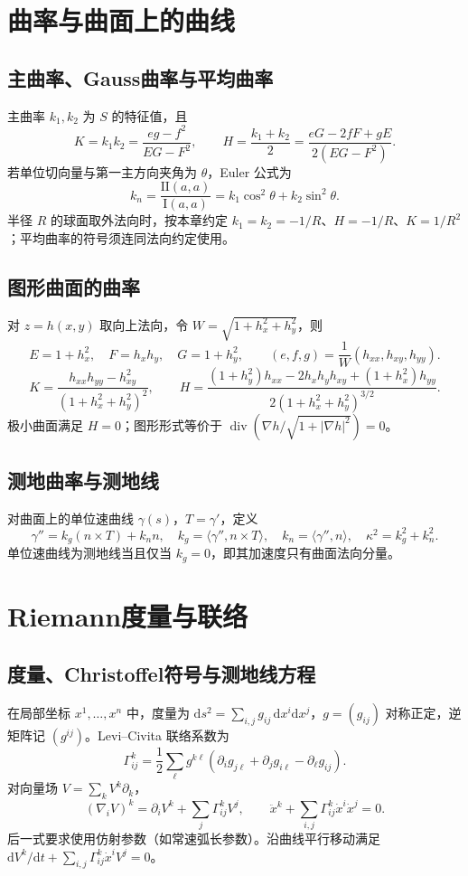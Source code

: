 \documentclass[../main.tex]{subfiles}
\begin{document}
\section{曲率与曲面上的曲线}
\subsection{主曲率、Gauss曲率与平均曲率}
主曲率 $k_1,k_2$ 为 $S$ 的特征值，且
\[
K=k_1k_2=\frac{eg-f^2}{EG-F^2},\qquad
H=\frac{k_1+k_2}2=\frac{eG-2fF+gE}{2(EG-F^2)}.
\]
若单位切向量与第一主方向夹角为 $\theta$，Euler 公式为
\[
k_n=\frac{\mathrm{II}(a,a)}{\mathrm I(a,a)}
=k_1\cos^2\theta+k_2\sin^2\theta.
\]
半径 $R$ 的球面取外法向时，按本章约定 $k_1=k_2=-1/R$、$H=-1/R$、$K=1/R^2$；平均曲率的符号须连同法向约定使用。
\subsection{图形曲面的曲率}
对 $z=h(x,y)$ 取向上法向，令 $W=\sqrt{1+h_x^2+h_y^2}$，则
\[
E=1+h_x^2,\quad F=h_xh_y,\quad G=1+h_y^2,\qquad
(e,f,g)=\frac1W(h_{xx},h_{xy},h_{yy}).
\]
\[
K=\frac{h_{xx}h_{yy}-h_{xy}^2}{(1+h_x^2+h_y^2)^2},\qquad
H=\frac{(1+h_y^2)h_{xx}-2h_xh_yh_{xy}+(1+h_x^2)h_{yy}}{2(1+h_x^2+h_y^2)^{3/2}}.
\]
极小曲面满足 $H=0$；图形形式等价于 $\operatorname{div}(\nabla h/\sqrt{1+|\nabla h|^2})=0$。
\subsection{测地曲率与测地线}
对曲面上的单位速曲线 $\gamma(s)$，$T=\gamma'$，定义
\[
\gamma''=k_g(n\times T)+k_nn,\quad
k_g=\langle\gamma'',n\times T\rangle,\quad k_n=\langle\gamma'',n\rangle,
\quad\kappa^2=k_g^2+k_n^2.
\]
单位速曲线为测地线当且仅当 $k_g=0$，即其加速度只有曲面法向分量。
\section{Riemann度量与联络}
\subsection{度量、Christoffel符号与测地线方程}
在局部坐标 $x^1,\ldots,x^n$ 中，度量为 $\mathrm ds^2=\sum_{i,j}g_{ij}\,\mathrm dx^i\mathrm dx^j$，$g=(g_{ij})$ 对称正定，逆矩阵记 $(g^{ij})$。Levi--Civita 联络系数为
\[
\Gamma^k_{ij}=\frac12\sum_\ell g^{k\ell}
(\partial_i g_{j\ell}+\partial_j g_{i\ell}-\partial_\ell g_{ij}).
\]
对向量场 $V=\sum_kV^k\partial_k$，
\[
(\nabla_iV)^k=\partial_iV^k+\sum_j\Gamma^k_{ij}V^j,\qquad
\ddot x^k+\sum_{i,j}\Gamma^k_{ij}\dot x^i\dot x^j=0.
\]
后一式要求使用仿射参数（如常速弧长参数）。沿曲线平行移动满足 $\mathrm dV^k/\mathrm dt+\sum_{i,j}\Gamma^k_{ij}\dot x^iV^j=0$。
\end{document}
